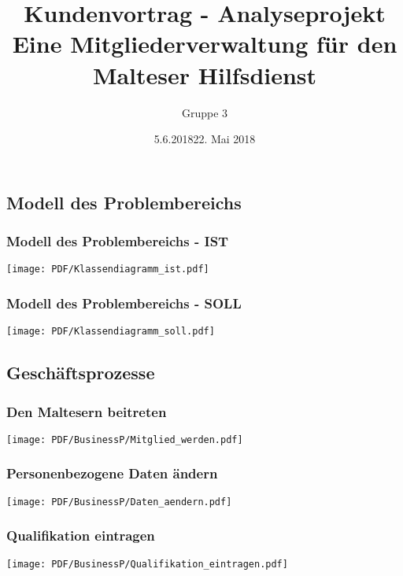 \documentclass{beamer}
\begin{document}
			
	
	\title[Kundenvortrag - Analyseprojekt]{Kundenvortrag - Analyseprojekt\\ Eine Mitgliederverwaltung für den Malteser Hilfsdienst}
	\date{5.6.2018}
	\author{Gruppe 3}
	
	 \begin{frame}[title=Hauptgebaeude_Nacht.jpg]
	 \maketitle
	 \date{22. Mai 2018}
 	\end{frame}
	 
		

\subsection{Modell des Problembereichs}		
\begin{frame}
\frametitle{Modell des Problembereichs - IST}
\texttt{[image: PDF/Klassendiagramm\_ist.pdf]}
\end{frame}
\begin{frame}
\frametitle{Modell des Problembereichs - SOLL}
\texttt{[image: PDF/Klassendiagramm\_soll.pdf]}
\end{frame}

\subsection{Geschäftsprozesse}		
\begin{frame}
\frametitle{Den Maltesern beitreten}
\texttt{[image: PDF/BusinessP/Mitglied\_werden.pdf]}
\end{frame}

\begin{frame}
\frametitle{Personenbezogene Daten ändern}
\texttt{[image: PDF/BusinessP/Daten\_aendern.pdf]}
\end{frame}

\begin{frame}
\frametitle{Qualifikation eintragen}
\texttt{[image: PDF/BusinessP/Qualifikation\_eintragen.pdf]}
\end{frame}


\end{document}
